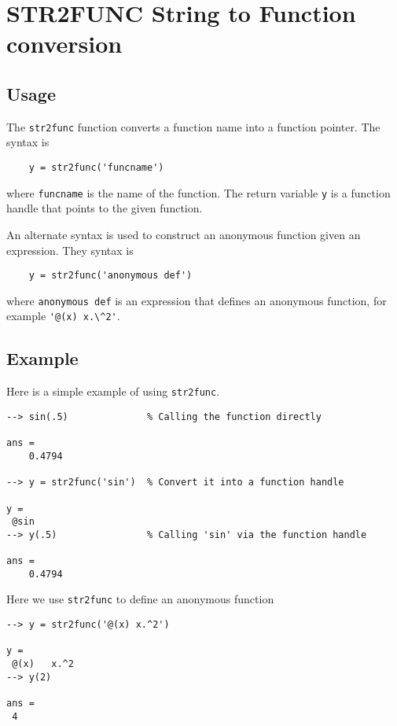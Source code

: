 \section{STR2FUNC String to Function conversion}

\subsection{Usage}

The \verb|str2func| function converts a function name into a 
function pointer.  The syntax is 
\begin{verbatim}
    y = str2func('funcname')
\end{verbatim}
where \verb|funcname| is the name of the function. The return
variable \verb|y| is a function handle that points to the given
function.

An alternate syntax is used to construct an anonymous function
given an expression.  They syntax is
\begin{verbatim}
    y = str2func('anonymous def')
\end{verbatim}
where \verb|anonymous def| is an expression that defines an
anonymous function, for example \verb|'@(x) x.\^2'|.
\subsection{Example}

Here is a simple example of using \verb|str2func|.
\begin{verbatim}
--> sin(.5)              % Calling the function directly

ans = 
    0.4794 

--> y = str2func('sin')  % Convert it into a function handle

y = 
 @sin
--> y(.5)                % Calling 'sin' via the function handle

ans = 
    0.4794 
\end{verbatim}
Here we use \verb|str2func| to define an anonymous function
\begin{verbatim}
--> y = str2func('@(x) x.^2')

y = 
 @(x)   x.^2
--> y(2)

ans = 
 4 
\end{verbatim}
